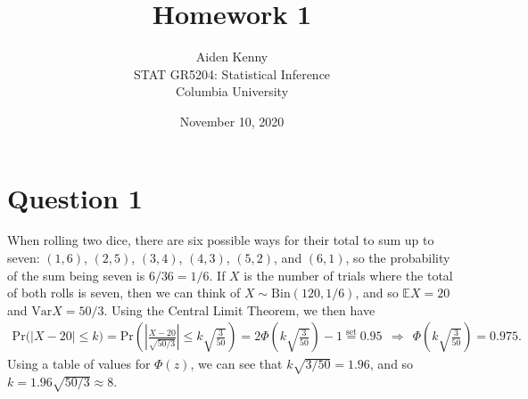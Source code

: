 \documentclass[10pt]{article}
\title{
    {\Large Homework 1}
}
\author{
    {\normalsize Aiden Kenny}\\
    {\normalsize STAT GR5204: Statistical Inference}\\
    {\normalsize Columbia University}
}
\date{\normalsize November 10, 2020}
\begin{document}
\maketitle

\section{Question 1} \noindent
When rolling two dice, there are six possible ways for their total to sum up to seven: \((1,6)\), \((2,5)\), \((3,4)\), \((4,3)\), \((5,2)\), and \((6,1)\), 
so the probability of the sum being seven is \(6 / 36 = 1 / 6\). If \(X\) is the number of trials where the total of both rolls is seven, then we can think 
of \(X \sim \mathrm{Bin}(120, 1/6)\), and so \(\mathbb{E}X = 20\) and \(\mathrm{Var}X = 50 / 3\). 
Using the Central Limit Theorem, we then have 
\begin{align*}
    \mathrm{Pr}\big( |X - 20| \le k \big)
    = \mathrm{Pr} \left( \left| \frac{X - 20}{\sqrt{50/3}} \right| \le k \sqrt{\frac{3}{50}} \right)
    = 2 \Phi \left( k \sqrt{\frac{3}{50}} \right) - 1
    \overset{\text{set}}{=} 0.95
    ~~\Longrightarrow~~ \Phi \left( k \sqrt{\frac{3}{50}} \right) = 0.975.
\end{align*}
Using a table of values for \(\Phi(z)\), we can see that \(k \sqrt{3 / 50} = 1.96\), and so \(k = 1.96 \sqrt{50/3} \approx 8\).

\end{document}
